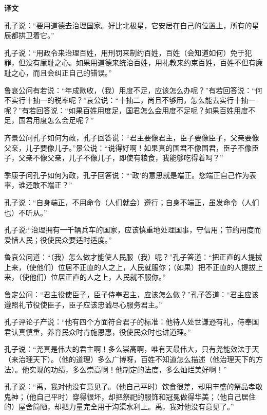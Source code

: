 \documentclass[12pt,UTF-8,openany,a4]{ctexbook}
\begin{document}
\newpage

\begin{Large}
    \noindent\textbf{译文}
\end{Large}


\vspace{1em}

\begin{large}
    \yiwen 
    孔子说：“要用道德去治理国家。好比北极星，它安居在自己的位置上，所有的星辰都拱卫着它。”
    
    孔子说：“用政令来治理百姓，用刑罚来制约百姓，百姓（会知道如何）免于犯罪，但没有廉耻之心。如果用道德来统治百姓，用礼教来约束百姓，百姓不但有廉耻之心，而且会纠正自己的错误。”
    
    鲁哀公问有若说：“年成歉收，（我）用度不足，应该怎么办呢？”有若回答说：“何不实行十抽一的税率呢？”哀公说：“十抽二，尚且不够用，怎么能去实行十抽一呢？”有若回答说：“如果百姓用度足，国君怎么会用度不足呢？如果百姓用度不足，国君用度怎么会足呢？”
    
    齐景公问孔子如何为政，孔子回答说：“君主要像君主，臣子要像臣子，父亲要像父亲，儿子要像儿子。”景公说：“说得好啊！如果真的国君不像国君，臣子不像臣子，父亲不像父亲，儿子不像儿子，即使有粮食，我能够吃得着吗？”
    
    季康子问孔子如何为政，孔子回答说：“‘政’的意思就是端正。您端正自己作为表率，谁还敢不端正？”
    
    孔子说：“自身端正，不用命令（人们就会）遵行；自身不端正，虽发命令（人们也）不听从。”
    
    孔子说:“治理拥有一千辆兵车的国家，应该慎重地处理国事，守信用；节约用度而爱惜人民；役使民众要适时适度。”
    
    鲁哀公问道：“（我）怎么做才能使人民服（我）呢？”孔子答道：“把正直的人提拔上来，（使他们）位居不正直的人之上，人民就服你；（如果）把不正直的人提拔上来，（使他们）位居正直的人之上，人民就不服你。”
    
    鲁定公问：“君主役使臣子，臣子侍奉君主，应该怎么做？”孔子答道：“君主应该遵照礼节役使臣子，臣子应该忠诚尽心服务君主。”
    
    孔子评论子产说：“他有四个方面符合君子的标准：他待人处世谦逊有礼，侍奉国君认真慎重，养育民众时肯施恩惠，役使民众时也讲道理。”
    
    孔子说：“尧真是伟大的君主啊！多么崇高啊，唯有天最伟大，只有尧能效法于天（来治理天下）。（他的道理）多么广博呀，百姓不知道怎么描述（他治理天下的方法）。他实现的功绩，多么崇高啊！他制定的法度，多么灿烂美好啊！”
    
    孔子说：“禹，我对他没有意见了。（他自己平时）饮食很差，却用丰盛的祭品孝敬鬼神；（他自己平时）穿得很坏，却把祭祀的服饰和冠冕做得华美；（他自己居住的）屋舍简陋，却把力量完全用于沟渠水利上。禹，我对他没有意见了。”
    
\end{large}
\end{document}

